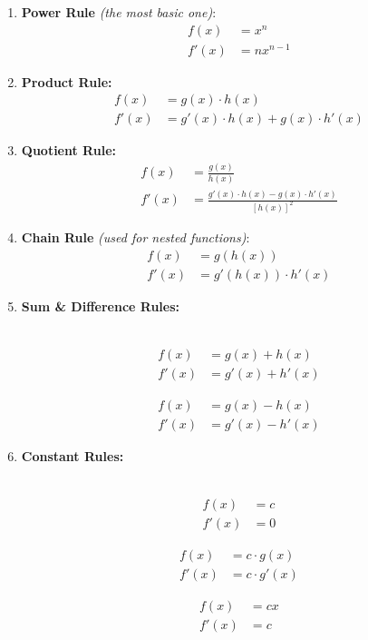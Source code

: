 \documentclass[11pt]{article}
\theoremstyle{plain}
\theoremstyle{definition}
\begin{document}
\begin{enumerate}
	\item \textbf{Power Rule}\textit{ (the most basic one)}:$$\begin{align}
		f(x)&=x^n\\
		f'(x)&=nx^{n-1}
	\end{align}$$
	\item \textbf{Product Rule:}$$\begin{align}
		f(x)&=g(x)\cdot h(x)\\
		f'(x)&= g'(x)\cdot h(x) + g(x) \cdot h'(x)
	\end{align}$$
	\item \textbf{Quotient Rule:}$$\begin{align}
		f(x)&=\frac{g(x)}{h(x)}\\
		f'(x)&= \frac{g'(x)\cdot h(x) - g(x) \cdot h'(x)}{[h(x)]^2}
	\end{align}$$
	\item \textbf{Chain Rule} \textit{(used for nested functions)}: $$\begin{align}
		f(x)&=g(h(x))\\
		f'(x)&=g'(h(x))\cdot h'(x)
	\end{align}$$
	\item \textbf{Sum \& Difference Rules:}\\ \\
	\begin{minipage}{.5\linewidth}
		$$\begin{align}
		f(x)&=g(x)+h(x)\\
		f'(x)&=g'(x)+h'(x)
		\end{align}$$
	\end{minipage}
	\begin{minipage}{.5\linewidth}
	$$\begin{align}
		f(x)&=g(x)-h(x)\\
		f'(x)&=g'(x)-h'(x)
	\end{align}$$
	\end{minipage}

	\item \textbf{Constant Rules:}\\ \\
	\begin{minipage}{.3\linewidth}
		$$\begin{align}
		f(x)&=c\\
		f'(x)&=0
		\end{align}$$
	\end{minipage}
	\begin{minipage}{.3\linewidth}
	$$\begin{align}
		f(x)&=c\cdot g(x)\\
		f'(x)&=c\cdot g'(x)
	\end{align}$$
	\end{minipage}
	\begin{minipage}{.3\linewidth}
	$$\begin{align}
		f(x)&=c x\\
		f'(x)&= c
	\end{align}$$
	\end{minipage}
\end{enumerate}
\end{document}
